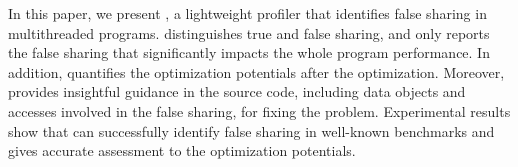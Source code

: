 \label{sec:conclusion}

In this paper, we present \cheetah{}, a lightweight profiler that identifies false sharing in multithreaded programs. \cheetah{} distinguishes true and false sharing, and only reports the false sharing that significantly impacts the whole program performance. In addition, \cheetah{} quantifies the optimization potentials after the optimization. Moreover, \cheetah{} provides insightful guidance in the source code, including data objects and accesses involved in the false sharing, for fixing the problem. Experimental results show that \cheetah{} can successfully identify false sharing in well-known benchmarks and gives accurate assessment to the optimization potentials.

